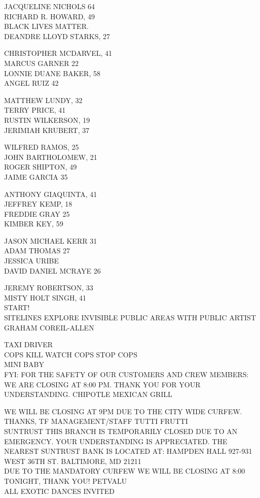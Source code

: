 \documentclass[10pt,letterpaper]{article}
\begin{document}
JACQUELINE NICHOLS 64\\
RICHARD R. HOWARD, 49\\
BLACK LIVES MATTER.\\
DEANDRE LLOYD STARKS, 27

CHRISTOPHER MCDARVEL, 41\\
MARCUS GARNER 22\\
LONNIE DUANE BAKER, 58\\
ANGEL RUIZ 42

MATTHEW LUNDY, 32\\
TERRY PRICE, 41\\
RUSTIN WILKERSON, 19\\
JERIMIAH KRUBERT, 37

WILFRED RAMOS, 25\\
JOHN BARTHOLOMEW, 21\\
ROGER SHIPTON, 49\\
JAIME GARCIA 35

ANTHONY GIAQUINTA, 41\\
JEFFREY KEMP, 18\\
FREDDIE GRAY 25\\
KIMBER KEY, 59

JASON MICHAEL KERR 31\\
ADAM THOMAS 27\\
JESSICA URIBE\\
DAVID DANIEL MCRAYE 26

JEREMY ROBERTSON, 33\\
MISTY HOLT SINGH, 41\\
START!\\
SITELINES EXPLORE INVISIBLE PUBLIC AREAS WITH PUBLIC ARTIST GRAHAM COREIL{-}ALLEN

TAXI DRIVER\\
COPS KILL WATCH COPS STOP COPS\\
MINI BABY\\
FYI: FOR THE SAFETY OF OUR CUSTOMERS AND CREW MEMBERS: WE ARE CLOSING AT 8:00 PM.  THANK YOU FOR YOUR UNDERSTANDING.  CHIPOTLE MEXICAN GRILL

WE WILL BE CLOSING AT 9PM DUE TO THE CITY WIDE CURFEW.  THANKS, TF MANAGEMENT/STAFF  TUTTI FRUTTI\\
SUNTRUST THIS BRANCH IS TEMPORARILY CLOSED DUE TO AN EMERGENCY.  YOUR UNDERSTANDING IS APPRECIATED.  THE NEAREST SUNTRUST BANK IS LOCATED AT: HAMPDEN HALL 927{-}931 WEST 36TH ST. BALTIMORE, MD 21211\\
DUE TO THE MANDATORY CURFEW WE WILL BE CLOSING AT 8:00 TONIGHT, THANK YOU!  PETVALU\\
ALL EXOTIC DANCES INVITED
\end{document}
